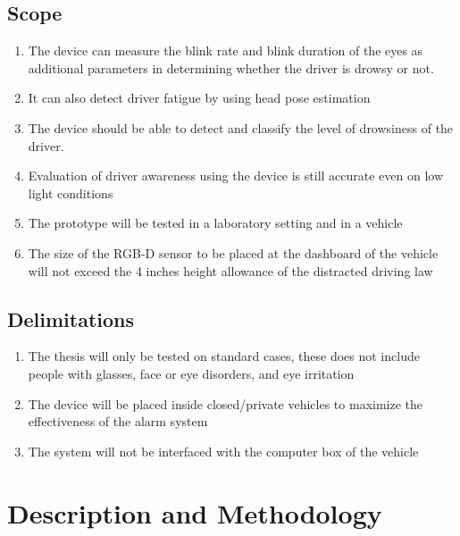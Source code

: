 \subsection{Scope}
\begin{enumerate}
	
	\item The device can measure the blink rate and blink duration of the eyes as additional parameters in determining whether the driver is drowsy or not.
	
	\item It can also detect driver fatigue by using head pose estimation
	
	\item The device should be able to detect and classify the level of drowsiness of the driver.
	
	
	\item Evaluation of driver awareness using the device is still accurate even on low light conditions
	
	\item The prototype will be tested in a laboratory setting and in a vehicle
	
	\item The size of the RGB-D sensor to be placed at the dashboard of the vehicle will not exceed the 4 inches height allowance of the distracted driving law
	
	
\end{enumerate}

\subsection{Delimitations}
\begin{enumerate}
	
	\item The thesis will only be tested on standard cases, these does not include people with glasses, face or eye disorders, and eye irritation
	
	
	\item The device will be placed inside closed/private vehicles to maximize the effectiveness of the alarm system
	
	\item The system will not be interfaced with the computer box of the vehicle
	
\end{enumerate}

\section{Description and Methodology}

